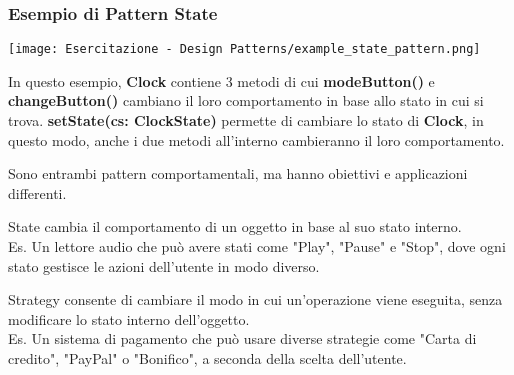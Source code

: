 {    \newpage
    \subsubsection{Esempio di Pattern State}
    \begin{center}
        \texttt{[image: Esercitazione - Design Patterns/example\_state\_pattern.png]}
    \end{center}
    In questo esempio, \textbf{Clock} contiene 3 metodi di cui \textbf{modeButton()} e \textbf{changeButton()} cambiano il loro
    comportamento in base allo stato in cui si trova. \textbf{setState(cs: ClockState)} permette di cambiare lo stato di \textbf{Clock},
    in questo modo, anche i due metodi all'interno cambieranno il loro comportamento.

    Sono entrambi pattern comportamentali, ma hanno obiettivi e applicazioni \\differenti.

    \begin{tcolorbox}[colback=blue!5!white, colframe=blue!75!black]
        State cambia il comportamento di un oggetto in base al suo stato interno.
        \\Es. Un lettore audio che può avere stati come "Play", "Pause" e "Stop", dove ogni stato 
        gestisce le azioni dell'utente in modo diverso.
    \end{tcolorbox}

    \begin{tcolorbox}[colback=green!5!white, colframe=green!75!black]
        Strategy consente di cambiare il modo in cui un'operazione viene eseguita, senza modificare lo stato interno dell'oggetto.
        \\Es. Un sistema di pagamento che può usare diverse strategie come "Carta di credito", "PayPal" o "Bonifico", a seconda della scelta dell'utente.
    \end{tcolorbox}
    \newpage

}